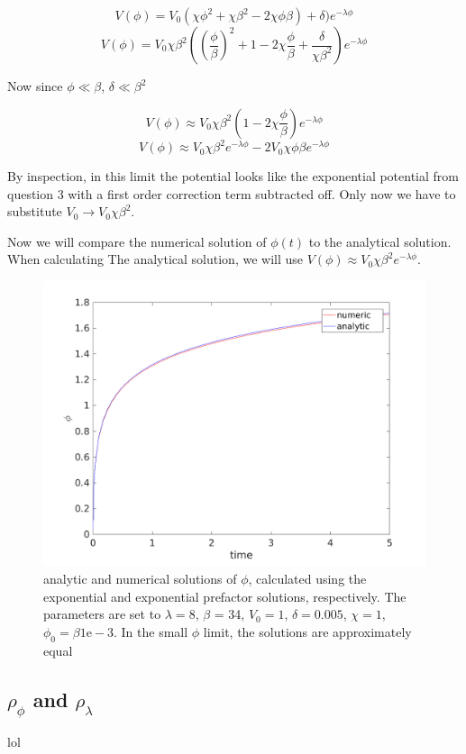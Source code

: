 \documentclass[12pt]{article}
\begin{document}
$$ V(\phi) = V_{0}(\chi \phi^2 + \chi \beta^2 - 2\chi\phi\beta) + \delta)e^{-\lambda \phi}$$
$$ V(\phi) = V_{0}\chi\beta^{2}((\frac{\phi}{\beta})^2 + 1 - 2\chi\frac{\phi}{\beta} + \frac{\delta}{\chi\beta^2})e^{-\lambda \phi}$$

Now since $\phi \ll \beta$, $\delta \ll \beta^2$

$$ V(\phi) \approx V_{0}\chi\beta^{2}(1 - 2\chi\frac{\phi}{\beta})e^{-\lambda \phi}$$
$$ V(\phi) \approx V_{0}\chi\beta^{2}e^{-\lambda \phi} - 2V_{0}\chi\phi\beta e^{-\lambda \phi}$$

By inspection, in this limit the potential looks like the exponential potential from question 3 with a first order correction term subtracted off. Only now we have to substitute $V_{0} \to V_{0}\chi\beta^2$. 

Now we will compare the numerical solution of $\phi(t)$ to the analytical solution. When calculating The analytical solution, we will use $V(\phi) \approx V_{0}\chi\beta^{2}e^{-\lambda \phi}$.

\begin{figure}
\centering
\includegraphics[width=5in]{phi_t.png}
\caption{analytic and numerical solutions of $\phi$, calculated using the exponential and exponential prefactor solutions, respectively. The parameters are set to $\lambda = 8$, $\beta$ = 34, $V_0 = 1$, $\delta = 0.005$, $\chi = 1$, $\phi_0 = \beta 1\mathrm{e}-3$. In the small $\phi$ limit, the solutions are approximately equal}
\end{figure}

\subsection{$\rho_{\phi}$ and $\rho_{\lambda}$}
lol
\end{document}
